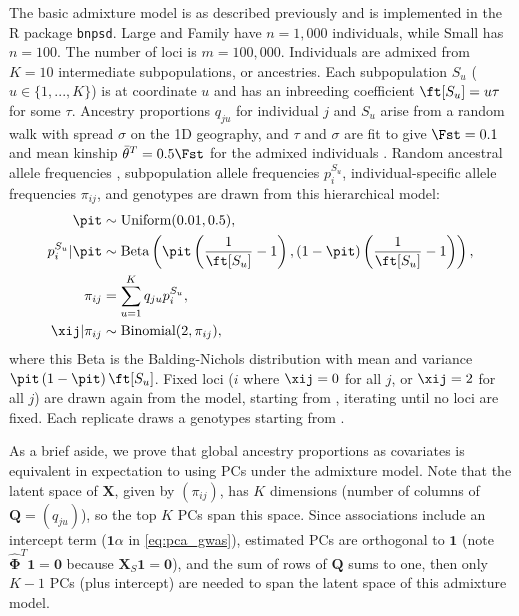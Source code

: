 \documentclass[11pt]{article}
\begin{document}
The basic admixture model is as described previously \citep{ochoa_estimating_2021} and is implemented in the R package \texttt{bnpsd}.
Large and Family have $n = 1,000$ individuals, while Small has $n = 100$.
The number of loci is $m = 100,000$.
Individuals are admixed from $K = 10$ intermediate subpopulations, or ancestries.
Each subpopulation $S_u$ ($u \in \{ 1, ..., K \}$) is at coordinate $u$ and has an inbreeding coefficient $\ft[S_u] = u \tau$ for some $\tau$.
Ancestry proportions $q_{ju}$ for individual $j$ and $S_u$ arise from a random walk with spread $\sigma$ on the 1D geography, and $\tau$ and $\sigma$ are fit to give $\Fst = 0.1$ and mean kinship $\bar{\theta}^T = 0.5 \Fst$ for the admixed individuals \citep{ochoa_estimating_2021}.
Random ancestral allele frequencies \pit, subpopulation allele frequencies $p_i^{S_u}$, individual-specific allele frequencies $\pi_{ij}$, and genotypes \xij are drawn from this hierarchical model:
\begin{align*}
  \pit
  &\sim
    \text{Uniform}( 0.01, 0.5 )
    , \\
  p_i^{S_u} | \pit
  &\sim
    \text{Beta} \left(
    \pit \left( \frac{1}{ \ft[S_u] } - 1 \right),
    \left( 1 - \pit \right) \left( \frac{1}{ \ft[S_u] } - 1 \right)
    \right)
    , \\
  \pi_{ij}
  &=
    \sum_{u = 1}^K q_{ju} p_i^{S_u}
    , \\
  \xij | \pi_{ij}
  &\sim
    \text{Binomial}(2, \pi_{ij})
    ,
\end{align*}
where this Beta is the Balding-Nichols distribution \citep{balding_method_1995} with mean \pit and variance $\pit \left( 1 - \pit \right) \ft[S_u]$.
Fixed loci ($i$ where $\xij = 0$ for all $j$, or $\xij = 2$ for all $j$) are drawn again from the model, starting from \pit, iterating until no loci are fixed.
Each replicate draws a genotypes starting from \pit.

As a brief aside, we prove that global ancestry proportions as covariates is equivalent in expectation to using PCs under the admixture model.
Note that the latent space of $\mathbf{X}$, given by $(\pi_{ij})$, has $K$ dimensions (number of columns of $\mathbf{Q} = (q_{ju})$), so the top $K$ PCs span this space.
Since associations include an intercept term ($\mathbf{1} \alpha$ in \cref{eq:pca_gwas}), estimated PCs are orthogonal to $\mathbf{1}$ (note $\mathbf{\hat{\Phi}}^T \mathbf{1} = \mathbf{0}$ because $\mathbf{X}_S \mathbf{1} = \mathbf{0}$), and the sum of rows of $\mathbf{Q}$ sums to one, then only $K-1$ PCs (plus intercept) are needed to span the latent space of this admixture model.
\end{document}
